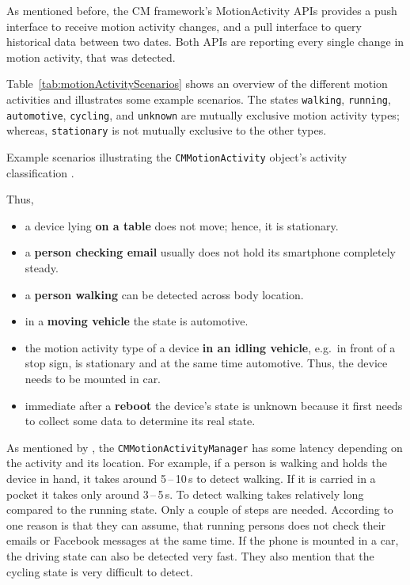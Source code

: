 As mentioned before, the \ac{CM} framework's MotionActivity \acsp{API} provides a push interface to receive motion activity changes, and a pull interface to query historical data between two dates. Both \acsp{API} are reporting every single change in motion activity, that was detected.

Table~\ref{tab:motionActivityScenarios} shows an overview of the different motion activities and illustrates some example scenarios. The states \texttt{walking}, \texttt{running}, \texttt{automotive}, \texttt{cycling}, and \texttt{unknown} are mutually exclusive motion activity types; whereas, \texttt{stationary} is not mutually exclusive to the other types.

\begin{table}
	
	\caption{Example scenarios illustrating the \texttt{CMMotionActivity} object's activity classification \citep{apple:wwdc_2014_pham}.}
	\label{tab:motionActivityScenarios}
\end{table}


Thus,
\begin{itemize}
  \item a device lying \textbf{on a table} does not move; hence, it is stationary.
  \item a \textbf{person checking email}  usually does not hold its smartphone completely steady.
  \item a \textbf{person walking} can be detected across body location.
  \item in a \textbf{moving vehicle} the state is automotive.
  \item the motion activity type of a device \textbf{in an idling vehicle}, e.g.\ in front of a stop sign, is stationary and at the same time automotive. Thus, the device needs to be mounted in car.

  \item immediate after a \textbf{reboot} the device's state is unknown because it first needs to collect some data to determine its real state.
\end{itemize}

\noindent As mentioned by \citet{apple:wwdc_2014_pham}, the \texttt{CMMotionActivityManager} has some latency depending on the activity and its location. For example, if a person is walking and holds the device in hand, it takes around 5\,--\,10\,s to detect walking. If it is carried in a pocket it takes only around 3\,--\,5\,s. To detect walking takes relatively long compared to the running state. Only a couple of steps are needed. According to \citet{apple:wwdc_2014_pham} one reason is that they can assume, that running persons does not check their emails or Facebook messages at the same time. If the phone is mounted in a car, the driving state can also be detected very fast. They also mention that the cycling state is very difficult to detect.


